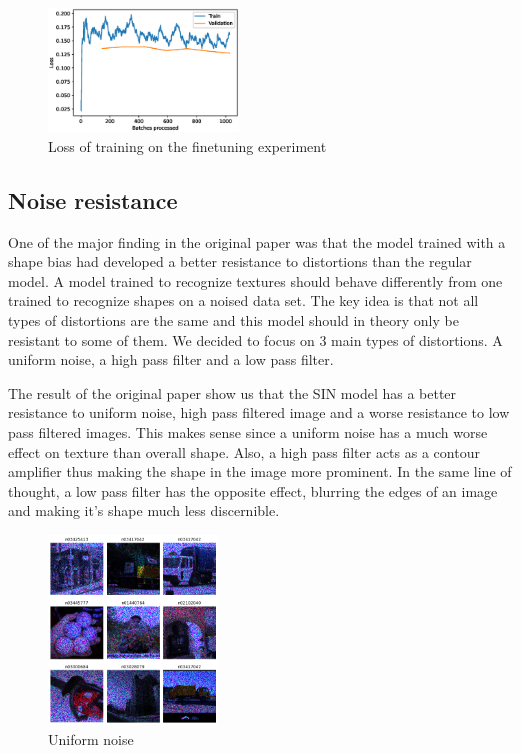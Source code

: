 \documentclass{article}
\begin{document}
\begin{figure}[h!]
  \includegraphics[width = 0.45\textwidth]{imgs/sinin/finetune/loss.eps}
  \caption{Loss of training on the finetuning experiment}
  \label{loss_finetune}
\end{figure}

\subsection{Noise resistance}


One of the major finding in the original paper was that the model trained with a shape bias had developed a better resistance to distortions than the regular model.
A model trained to recognize textures should behave differently from one trained to recognize shapes on a noised data set.  The key idea is that not all types of distortions are the same and this model should in theory only be resistant to some of them.  We decided to focus on 3 main types of distortions.  A uniform noise, a high pass filter and a low pass filter.

The result of the original paper show us that the SIN model has a better resistance to uniform noise, high pass filtered image and a worse resistance to low pass filtered images.
This makes sense since a uniform noise has a much worse effect on texture than overall shape. Also, a high pass filter acts as a contour amplifier thus making the shape in the image more prominent. In the same line of thought, a low pass filter has the opposite effect, blurring the edges of an image and making it's shape much less discernible.

\begin{figure}[h!]
\centering
\includegraphics[width = 0.4\textwidth]{imgs/image_uniform}
\caption{Uniform noise}
\end{figure}
\end{document}
